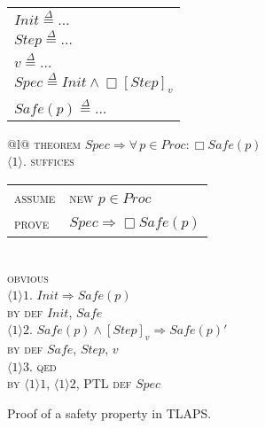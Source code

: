 \documentclass{easychair}
\renewcommand{\implies}{\Rightarrow}
\newcommand{\kw}[1]{\textsc{#1}}  %
\newcommand{\ps}[2]{\ensuremath{\langle #1 \rangle #2}}
\newcommand{\deq}{\mathrel{\stackrel{\scriptscriptstyle\Delta}{=}}}
\def\A{\forall\,}
\begin{document}
\begin{figure}[bp]
  \centering
  \begin{minipage}[t]{.3\linewidth}
    \begin{tabular}[t]{@{}l@{}}
      $Init \deq \ldots$\\
      $Step \deq \ldots$\\
      $v \deq \ldots$\\
      $Spec \deq Init \land \Box[Step]_v$\\[.5ex]
      $Safe(p) \deq \ldots$
    \end{tabular}
  \end{minipage}
  \begin{minipage}[t]{.55\linewidth}
    \begin{tabular}[t]{@{}l@{}}
      \kw{theorem} $Spec \implies \A p \in Proc : \Box Safe(p)$\\
      \ps{1}{.} \kw{suffices}%
                  \begin{tabular}[t]{@{\ }l@{\ }l}
                    \kw{assume} & \kw{new} $p \in Proc$\\
                    \kw{prove}  & $Spec \implies \Box Safe(p)$
                  \end{tabular}\\[-.4em]
      \quad\kw{obvious}\\
      \ps{1}{1.} $Init \implies Safe(p)$\\
      \quad\kw{by} \kw{def} $Init$, $Safe$\\
      \ps{1}{2.}
         $Safe(p) \land [Step]_v \implies Safe(p)'$\\
      \quad\kw{by} \kw{def}
        $Safe$, $Step$, $v$\\
      \ps{1}{3.} \kw{qed}\\
      \quad\kw{by} \ps{1}{1}, \ps{1}{2},
      PTL \kw{def} $Spec$
    \end{tabular}
  \end{minipage}
  \caption{Proof of a safety property in TLAPS.}
  \label{fig:safety-example}
\end{figure}
\end{document}
